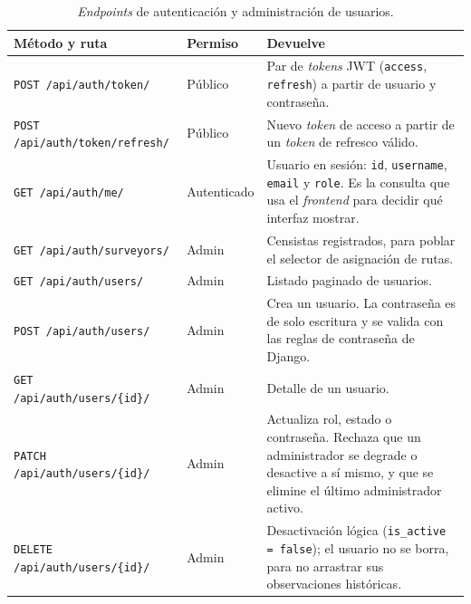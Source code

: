 \begin{table}[H]
  \centering
  \caption{\textit{Endpoints} de autenticación y administración de usuarios.}
  \label{tab:anexo_api_auth}
  \small
  \begin{tabularx}{\textwidth}{@{}p{5.5cm} p{1.9cm} X@{}}
    \toprule
    Método y ruta &
      Permiso &
      Devuelve \\
    \midrule
    \texttt{POST \slash api\slash auth\slash token\slash } &
      Público &
      Par de \textit{tokens} JWT (\texttt{access}, \texttt{refresh}) a partir de usuario y
      contraseña. \\
    \texttt{POST \slash api\slash auth\slash token\slash refresh\slash } &
      Público &
      Nuevo \textit{token} de acceso a partir de un \textit{token} de refresco válido. \\
    \texttt{GET \slash api\slash auth\slash me\slash } &
      Autenticado &
      Usuario en sesión: \texttt{id}, \texttt{username}, \texttt{email} y \texttt{role}. Es la
      consulta que usa el \textit{frontend} para decidir qué interfaz mostrar. \\
    \texttt{GET \slash api\slash auth\slash surveyors\slash } &
      Admin &
      Censistas registrados, para poblar el selector de asignación de rutas. \\
    \texttt{GET \slash api\slash auth\slash users\slash } &
      Admin &
      Listado paginado de usuarios. \\
    \texttt{POST \slash api\slash auth\slash users\slash } &
      Admin &
      Crea un usuario. La contraseña es de solo escritura y se valida con las reglas de
      contraseña de Django. \\
    \texttt{GET \slash api\slash auth\slash users\slash \{id\}\slash } &
      Admin &
      Detalle de un usuario. \\
    \texttt{PATCH \slash api\slash auth\slash users\slash \{id\}\slash } &
      Admin &
      Actualiza rol, estado o contraseña. Rechaza que un administrador se degrade o desactive a
      sí mismo, y que se elimine el último administrador activo. \\
    \texttt{DELETE \slash api\slash auth\slash users\slash \{id\}\slash } &
      Admin &
      Desactivación lógica (\texttt{is\_active = false}); el usuario no se borra, para no
      arrastrar sus observaciones históricas. \\
    \bottomrule
  \end{tabularx}
\end{table}

